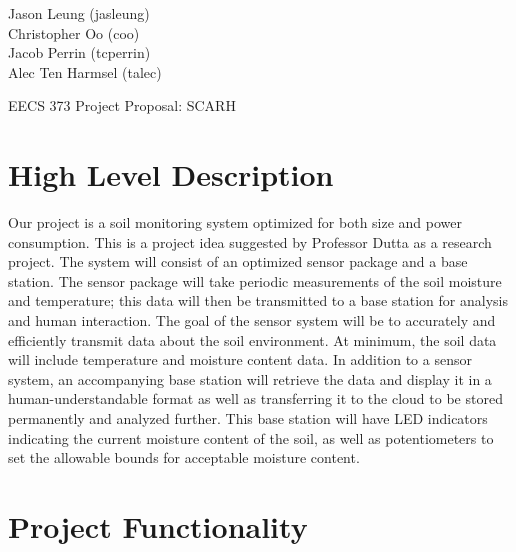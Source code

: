 \documentclass{article}
\begin{document}
\begin{flushright}
    Jason Leung (jasleung)\\
    Christopher Oo (coo)\\
    Jacob Perrin (tcperrin)\\
    Alec Ten Harmsel (talec)
\end{flushright}

\begin{center}
    {\Huge
        EECS 373 Project Proposal: SCARH
    }
\end{center}

\section{High Level Description}
Our project is a soil monitoring system optimized for both size and power
consumption.  This is a project idea suggested by Professor Dutta as a research
project. The system will consist of an optimized sensor package and a base
station. The sensor package will take periodic measurements of the soil
moisture and temperature; this data will then be transmitted to a base station
for analysis and human interaction. The goal of the sensor system will be to
accurately and efficiently transmit data about the soil environment. At
minimum, the soil data will include temperature and moisture content data. In
addition to a sensor system, an accompanying base station will retrieve the
data and display it in a human-understandable format as well as transferring it
to the cloud to be stored permanently and analyzed further. This base station
will have LED indicators indicating the current moisture content of the soil,
as well as potentiometers to set the allowable bounds for acceptable moisture
content.

\section{Project Functionality}
\end{document}

